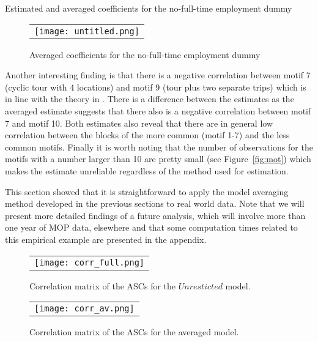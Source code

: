 \documentclass[12pt, a4paper]{article}
\numberwithin{defcounter}{section}
\numberwithin{excounter}{section}
\begin{document}
\begin{landscape}
{\tiny
\begin{table}[t]
\centering
\caption{Estimated and averaged coefficients for the no-full-time employment dummy}

\label{tab:mot_coeff}
\end{table}
}

\begin{figure}%
\label{pl:motif2}
{\caption{Averaged coefficients for the no-full-time employment dummy}\label{fig:mot2}}%
\begin{tabular}{@{}r@{}} 
\texttt{[image: untitled.png]}\\
\end{tabular}
\end{figure}
\end{landscape}

Another interesting finding is that there is a negative correlation between motif 7 (cyclic tour with 4 locations) and motif 9 (tour plus two separate trips) which is in line with the theory in \cite{schneider2013}. There is a difference between the estimates as the averaged estimate suggests that there also is a negative correlation between motif 7 and motif 10. Both estimates also reveal that there are in general low correlation between the blocks of the more common (motif 1-7) and the less common motifs. Finally it is worth noting that the number of observations for the motifs with a number larger than 10 are pretty small (see Figure~\ref{fig:mot}) which makes the estimate unreliable regardless of the method used for estimation.

This section showed that it is straightforward to apply the model averaging method developed in the previous sections to real world data. Note that we will present more detailed findings of a future analysis, which will involve more than one year of MOP data, elsewhere and that some computation times related to this empirical example are presented in the appendix.
\clearpage

\begin{figure}[t]%
{\caption{Correlation matrix of the ASCs for the $Unresticted$ model.}
\label{fig:corr_full}}%
\begin{tabular}{@{}r@{}} 
\texttt{[image: corr\_full.png]}\\
\end{tabular}
\end{figure}
\begin{figure}[t]%
{\caption{Correlation matrix of the ASCs for the averaged model.}
\label{fig:corr_av}}%
\begin{tabular}{@{}r@{}} 
\texttt{[image: corr\_av.png]}\\
\end{tabular}
\end{figure}
\end{document}
